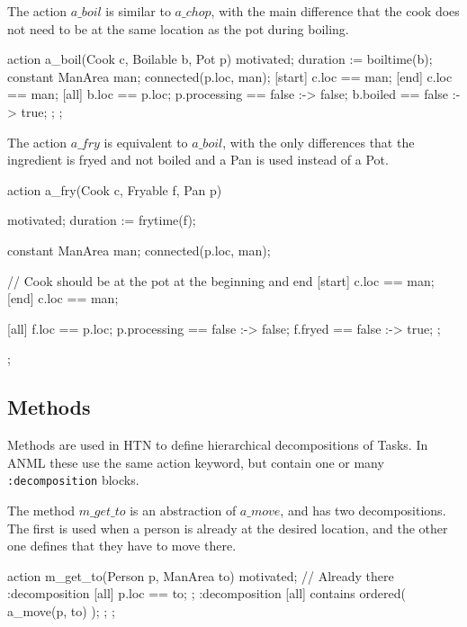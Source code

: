 The action $a\_boil$ is similar to $a\_chop$, with the main difference that the cook does not need to be at the same location as the pot during boiling.

\begin{anmlcode}
action a_boil(Cook c, Boilable b, Pot p) {
  motivated;
  duration := boiltime(b);
  constant ManArea man;
  connected(p.loc, man);
  [start] c.loc == man;
  [end] c.loc == man;
  [all] {
    b.loc == p.loc;
    p.processing == false :-> false;
    b.boiled == false :-> true;
  };
};
\end{anmlcode}

The action $a\_fry$ is equivalent to $a\_boil$, with the only differences that the ingredient is fryed and not boiled and a Pan is used instead of a Pot.

\begin{anmlcode}
action a_fry(Cook c, Fryable f, Pan p) {
  motivated;
  duration := frytime(f);

  constant ManArea man;
  connected(p.loc, man);

  // Cook should be at the pot at the beginning and end
  [start] c.loc == man;
  [end] c.loc == man;

  [all] {
    f.loc == p.loc;
    p.processing == false :-> false;
    f.fryed == false :-> true;
  };
};
\end{anmlcode}

\subsection{Methods}

Methods are used in HTN to define hierarchical decompositions of Tasks.
In ANML these use the same action keyword, but contain one or many \verb|:decomposition| blocks.

The method $m\_get\_to$ is an abstraction of $a\_move$, and has two decompositions.
The first is used when a person is already at the desired location, and the other one defines that they have to move there.

\begin{anmlcode}
action m_get_to(Person p, ManArea to) {
  motivated;
  // Already there
  :decomposition {
    [all] p.loc == to;
  };
  :decomposition {
    [all] contains ordered(
      a_move(p, to)
    );
  };
};
\end{anmlcode}